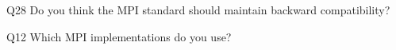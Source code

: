 \begin{description}%
\item{Q28} Do you think the MPI standard should maintain backward compatibility?%
\item{Q12} Which MPI implementations do you use?%
\end{description}%
